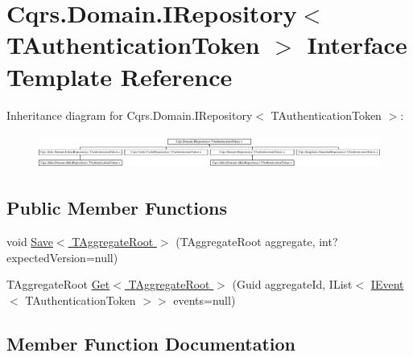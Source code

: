 \hypertarget{interfaceCqrs_1_1Domain_1_1IRepository}{}\section{Cqrs.\+Domain.\+I\+Repository$<$ T\+Authentication\+Token $>$ Interface Template Reference}
\label{interfaceCqrs_1_1Domain_1_1IRepository}
Inheritance diagram for Cqrs.\+Domain.\+I\+Repository$<$ T\+Authentication\+Token $>$\+:\begin{figure}[H]
\begin{center}
\leavevmode
\includegraphics[height=1.138211cm]{interfaceCqrs_1_1Domain_1_1IRepository}
\end{center}
\end{figure}
\subsection*{Public Member Functions}
\begin{DoxyCompactItemize}
\item 
void \hyperlink{interfaceCqrs_1_1Domain_1_1IRepository_a6086f15a0fef4982da553d24aee04015_a6086f15a0fef4982da553d24aee04015}{Save$<$ T\+Aggregate\+Root $>$} (T\+Aggregate\+Root aggregate, int? expected\+Version=null)
\item 
T\+Aggregate\+Root \hyperlink{interfaceCqrs_1_1Domain_1_1IRepository_a9a6f6fe2ae808009344f1eb8ad96f448_a9a6f6fe2ae808009344f1eb8ad96f448}{Get$<$ T\+Aggregate\+Root $>$} (Guid aggregate\+Id, I\+List$<$ \hyperlink{interfaceCqrs_1_1Events_1_1IEvent}{I\+Event}$<$ T\+Authentication\+Token $>$$>$ events=null)
\end{DoxyCompactItemize}


\subsection{Member Function Documentation}
\mbox{\label{interfaceCqrs_1_1Domain_1_1IRepository_a9a6f6fe2ae808009344f1eb8ad96f448_a9a6f6fe2ae808009344f1eb8ad96f448}} 
